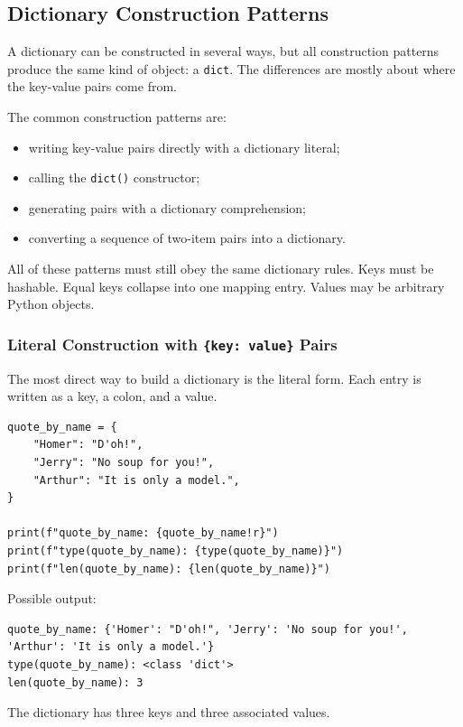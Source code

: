 \subsection{Dictionary Construction Patterns}

A dictionary can be constructed in several ways, but all construction patterns produce the same kind of object: a \texttt{dict}. The differences are mostly about where the key-value pairs come from.

The common construction patterns are:

\begin{itemize}
    \item writing key-value pairs directly with a dictionary literal;
    \item calling the \texttt{dict()} constructor;
    \item generating pairs with a dictionary comprehension;
    \item converting a sequence of two-item pairs into a dictionary.
\end{itemize}

All of these patterns must still obey the same dictionary rules. Keys must be hashable. Equal keys collapse into one mapping entry. Values may be arbitrary Python objects.

\subsubsection{Literal Construction with \texttt{\{key: value\}} Pairs}

The most direct way to build a dictionary is the literal form. Each entry is written as a key, a colon, and a value.

\begin{verbatim}
quote_by_name = {
    "Homer": "D'oh!",
    "Jerry": "No soup for you!",
    "Arthur": "It is only a model.",
}

print(f"quote_by_name: {quote_by_name!r}")
print(f"type(quote_by_name): {type(quote_by_name)}")
print(f"len(quote_by_name): {len(quote_by_name)}")
\end{verbatim}

Possible output:

\begin{verbatim}
quote_by_name: {'Homer': "D'oh!", 'Jerry': 'No soup for you!', 'Arthur': 'It is only a model.'}
type(quote_by_name): <class 'dict'>
len(quote_by_name): 3
\end{verbatim}

The dictionary has three keys and three associated values.

